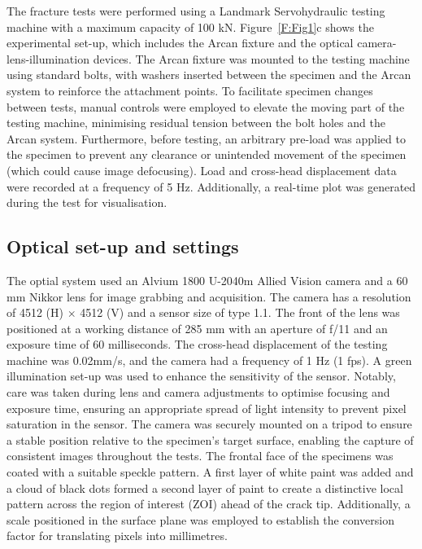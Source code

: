 \documentclass[3p,times,procedia]{elsarticle}
\begin{document}
The fracture tests were performed using a Landmark Servohydraulic testing machine with a maximum capacity of 100 kN. Figure~\ref{F:Fig1}c shows the experimental set-up, which includes the Arcan fixture and the optical camera-lens-illumination devices. The Arcan fixture was mounted to the testing machine using standard bolts, with washers inserted between the specimen and the Arcan system to reinforce the attachment points. To facilitate specimen changes between tests, manual controls were employed to elevate the moving part of the testing machine, minimising residual tension between the bolt holes and the Arcan system. Furthermore, before testing, an arbitrary pre-load was applied to the specimen to prevent any clearance or unintended movement of the specimen (which could cause image defocusing). Load and cross-head displacement data were recorded at a frequency of 5 Hz. Additionally, a real-time plot was generated during the test for visualisation.


\subsection{Optical set-up and settings}\label{Ss:optical}

The optial system used an Alvium 1800 U-2040m Allied Vision camera and a 60 mm Nikkor lens for image grabbing and acquisition. The camera has a resolution of 4512 (H) $\times$ 4512 (V) and a sensor size of type 1.1. The front of the lens was positioned at a working distance of 285 mm with an aperture of f/11 and an exposure time of 60 milliseconds. The cross-head displacement of the testing machine was 0.02mm/s, and the camera had a frequency of 1 Hz (1 fps).
A green illumination set-up was used to enhance the sensitivity of the sensor. Notably, care was taken during lens and camera adjustments to optimise focusing and exposure time, ensuring an appropriate spread of light intensity to prevent pixel saturation in the sensor. The camera was securely mounted on a tripod to ensure a stable position relative to the specimen's target surface, enabling the capture of consistent images throughout the tests. The frontal face of the specimens was coated with a suitable speckle pattern. A first layer of white paint was added and a cloud of black dots formed a second layer of paint to create a distinctive local pattern across the region of interest (ZOI) ahead of the crack tip. Additionally, a scale positioned in the surface plane was employed to establish the conversion factor for translating pixels into millimetres.
\end{document}
